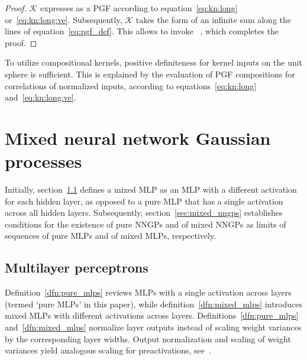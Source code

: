 \documentclass[final, 12pt]{colt2021} %
\begin{document}
\begin{proof}
	$\mathcal{K}$ expresses as a PGF
	according to equation~\eqref{eq:kn:long}
	or~\eqref{eq:kn:long:ve}.
	Subsequently, $\mathcal{K}$
	takes the form of an infinite sum
	along the lines of equation~\eqref{eq:pgf_def}.
	This allows to invoke
	~\citet[lemma 4]{smola2001},
	which completes the proof.
\end{proof}

To utilize compositional kernels,
positive definiteness for kernel inputs on the unit sphere
is sufficient.
This is explained by the evaluation of PGF compositions
for correlations of normalized inputs, according to
equations~\eqref{eq:kn:long} and~\eqref{eq:kn:long:ve}.

\section{Mixed neural network Gaussian processes}
\label{sec:mixed_and_theta_nngps}

Initially, section~\ref{sec:mixed_mlps}
defines a mixed MLP
as an MLP with a different activation for each hidden layer,
as opposed to a pure MLP
that has a single activation across all hidden layers.
Subsequently,
section~\ref{sec:mixed_nngps}
establishes
conditions for the existence
of pure NNGPs and of mixed NNGPs
as limits
of sequences of pure MLPs and of mixed MLPs, respectively.




\subsection{Multilayer perceptrons}
\label{sec:mixed_mlps}

Definition~\ref{dfn:pure_mlps}
reviews MLPs with a single activation across layers
(termed `pure MLPs' in this paper),
while definition~\ref{dfn:mixed_mlps}
introduces mixed MLPs with different activations across layers.
Definitions~\ref{dfn:pure_mlps} and~\ref{dfn:mixed_mlps}
normalize layer outputs
instead of scaling weight variances by the corresponding layer widths.
Output normalization and scaling of weight variances
yield analogous scaling for preactivations,
see~\citet{liang2021}.
\end{document}
